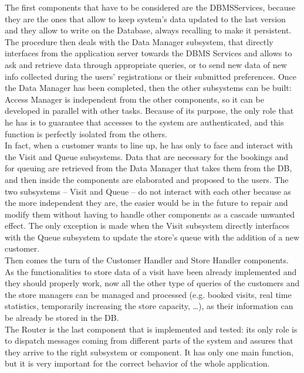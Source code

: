 \documentclass[]{article}
\begin{document}
The first components that have to be considered are the DBMSServices, because they are the ones that allow to keep system’s data updated to the last version and they allow to write on the Database, always recalling to make it persistent.\\ \newline
The procedure then deals with the Data Manager subsystem, that directly interfaces from the application server towards the DBMS Services and allows to ask and retrieve data through appropriate queries, or to send new data of new info collected during the users’ registrations or their submitted preferences.
Once the Data Manager has been completed, then the other subsystems can be built: Access Manager is independent from the other components, so it can be developed in parallel with other tasks. Because of its purpose, the only role that he has is to guarantee that accesses to the system are authenticated, and this function is perfectly isolated from the others.\\ \newline
In fact, when a customer wants to line up, he has only to face and interact with the Visit and Queue subsystems. Data that are necessary for the bookings and for queuing are retrieved from the Data Manager that takes them from the DB, and then inside the components are elaborated and proposed to the users. The two subsystems – Visit and Queue – do not interact with each other because as the more independent they are, the easier would be in the future to repair and modify them without having to handle other components as a cascade unwanted effect. The only exception is made when the Visit subsystem directly interfaces with the Queue subsystem to update the store’s queue with the addition of a new customer.\\ \newline
Then comes the turn of the Customer Handler and Store Handler components. As the functionalities to store data of a visit have been already implemented and they should properly work, now all the other type of queries of the customers and the store managers can be managed and processed (e.g. booked visits, real time statistics, temporarily increasing the store capacity, …), as their information can be already be stored in the DB.\\ \newline
The Router is the last component that is implemented and tested: its only role is to dispatch messages coming from different parts of the system and assures that they arrive to the right subsystem or component. It has only one main function, but it is very important for the correct behavior of the whole application.
\end{document}

